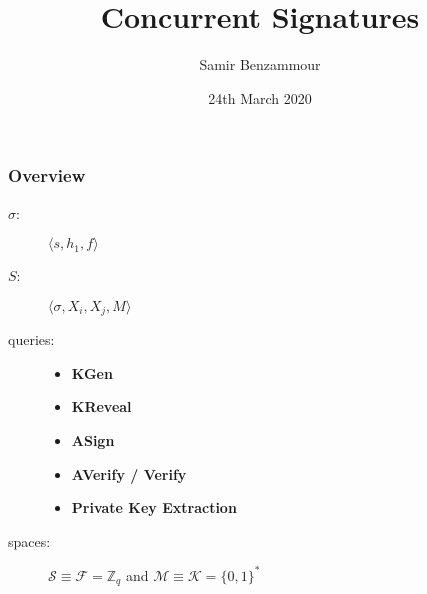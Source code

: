 \documentclass[usenames,dvipsnames]{beamer}
\title{Concurrent Signatures}
\author{Samir Benzammour}
\date{24th March 2020}
\institute[RWTH]{
  Algorithms and Computational Complexity\\
  RWTH Aachen University
}
\newcommand{\goedel}[1]{\langle #1 \rangle}
\newcommand{\ints}{\mathbb{Z}}
\newcommand{\mespace}{\mathcal{M}}
\newcommand{\sspace}{\mathcal{S}}
\newcommand{\kspace}{\mathcal{K}}
\newcommand{\kfspace}{\mathcal{F}}
\begin{document}
\frame{\titlepage}

\begin{frame}
	\frametitle{Overview}
  \begin{center}
    \begin{description}
      \item[\(\sigma\):] \(\goedel{s,h_1,f}\)
      \item[\(S\):] \(\goedel{\sigma, X_i, X_j, M}\)
      \item[queries:] 
        \vspace{.2cm}
          \begin{minipage}{0.35\textwidth}
            \begin{itemize}
              \item \textbf{KGen}
              \item \textbf{KReveal}
              \item \textbf{ASign} 
            \end{itemize}
          \end{minipage}%
          \begin{minipage}{0.35\textwidth}
            \begin{itemize}
              \item \textbf{AVerify / Verify}
              \item \textbf{Private Key Extraction}  
            \end{itemize}
          \end{minipage}\vspace{.3cm}
      \item[spaces:] $\sspace \equiv \kfspace = \ints_q$ and $\mespace \equiv \kspace = \{0,1\}^\ast$
  \end{description} 
  \end{center}
  
\end{frame}
\end{document}
